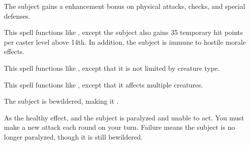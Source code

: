 \spellrng{\rngclose}
\begin{spelleffect}
  The subject gains a  enhancement bonus on physical attacks, checks, and special defenses. \bonusscalingdescription
\end{spelleffect}

\begin{spelleffect}
  This spell functions like , except the subject also gains 35 temporary hit points  per caster level above 14th. In addition, the subject is immune to hostile morale effects.
\end{spelleffect}

\begin{spelleffect}
  This spell functions like , except that it is not limited by creature type.
\end{spelleffect}

\begin{spelleffect}
  This spell functions like , except that it affects multiple creatures.
\end{spelleffect}

\spellrng{\rngclose}
\begin{spellhealthy}
  The subject is bewildered, making it \vulnerable.
\end{spellhealthy}
\begin{spellblood}
  As the healthy effect, and the subject is paralyzed and unable to act. You must make a new attack each round on your turn. Failure means the subject is no longer paralyzed, though it is still bewildered.
\end{spellblood}

